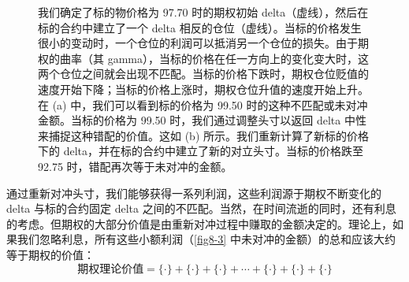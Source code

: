 \begin{figure}
\begin{subfigure}{0.45\textwidth}
        \label{fig8-3b}
    \end{subfigure}
    \caption{我们确定了标的物价格为 97.70 时的期权初始 delta（虚线），然后在标的合约中建立了一个 delta 相反的仓位（虚线）。当标的价格发生很小的变动时，一个仓位的利润可以抵消另一个仓位的损失。由于期权的曲率（其 gamma），当标的价格在任一方向上的变化变大时，这两个仓位之间就会出现不匹配。当标的价格下跌时，期权仓位贬值的速度开始下降；当标的价格上涨时，期权仓位升值的速度开始上升。在 (a) 中，我们可以看到标的价格为 99.50 时的这种不匹配或未对冲金额。当标的价格为 99.50 时，我们通过调整头寸以返回 delta 中性来捕捉这种错配的价值。这如 (b) 所示。我们重新计算了新标的价格下的 delta，并在标的合约中建立了新的对立头寸。当标的价格跌至 92.75 时，错配再次等于未对冲的金额。}
    \label{fig8-3}
\end{figure}

通过重新对冲头寸，我们能够获得一系列利润，这些利润源于期权不断变化的 delta 与标的合约固定 delta 之间的不匹配。当然，在时间流逝的同时，还有利息的考虑。但期权的大部分价值是由重新对冲过程中赚取的金额决定的。理论上，如果我们忽略利息，所有这些小额利润（\autoref{fig8-3} 中未对冲的金额）的总和应该大约等于期权的价值：
$$\text{期权理论价值} = \{\cdot\} + \{\cdot\} + \{\cdot\} + ⋯ + \{\cdot\} + \{\cdot\} + \{\cdot\}$$
